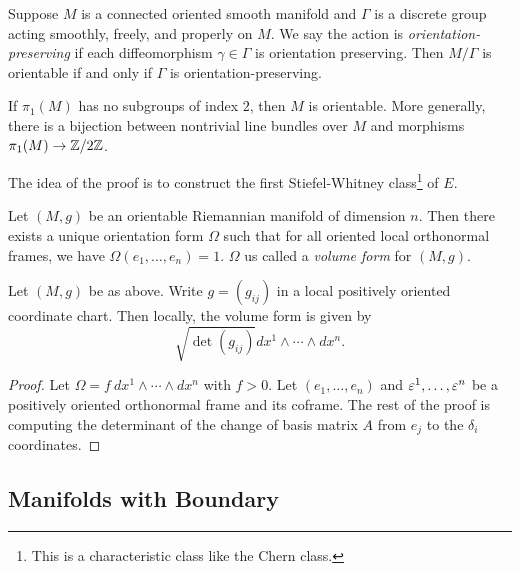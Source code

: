 \documentclass[twoside, 10pt]{article}
\begin{document}
    \begin{prop} Suppose $M$ is a connected oriented smooth manifold and
        $\Gamma$ is a discrete group acting smoothly, freely, and properly on
        $M$. We say the action is \textit{orientation-preserving} if each
        diffeomorphism $\gamma \in \Gamma$ is orientation preserving. Then
        $M/\Gamma$ is orientable if and only if $\Gamma$ is
        orientation-preserving.  \end{prop}

    \begin{cor} If $\pi_1(M)$ has no subgroups of index $2$, then $M$ is
    orientable. More generally, there is a bijection between nontrivial line
bundles over $M$ and morphisms $\pi_1(M) \to \mathbb{Z}/2\mathbb{Z}$.  \end{cor}

    The idea of the proof is to construct the first Stiefel-Whitney
    class\footnote{This is a characteristic class like the Chern class.} of
    $E$. 

    \begin{prop} Let $(M,g)$ be an orientable Riemannian manifold of dimension
        $n$. Then there exists a unique orientation form $\Omega$ such that for
        all oriented local orthonormal frames, we have $\Omega(e_1, \ldots,
        e_n) = 1$. $\Omega$ us called a \textit{volume form} for $(M,g)$.
    \end{prop}

    \begin{lem} Let $(M,g)$ be as above. Write $g = (g_{ij})$ in a local
        positively oriented coordinate chart. Then locally, the volume form is
        given by \[ \sqrt{\det(g_{ij})} dx^1 \wedge \cdots \wedge dx^n.\]
    \end{lem}

    \begin{proof} Let $\Omega = f\ dx^1 \wedge \cdots \wedge dx^n$ with $f >
        0$. Let $(e_1, \ldots, e_n)$ and $\varepsilon^1, \ldots, \varepsilon^n$ be a positively
        oriented orthonormal frame and its coframe. The rest of the proof is
        computing the determinant of the change of basis matrix $A$ from $e_j$
        to the $\delta_i$ coordinates.  \end{proof}

    \subsection{Manifolds with Boundary}%
    
\end{document}
